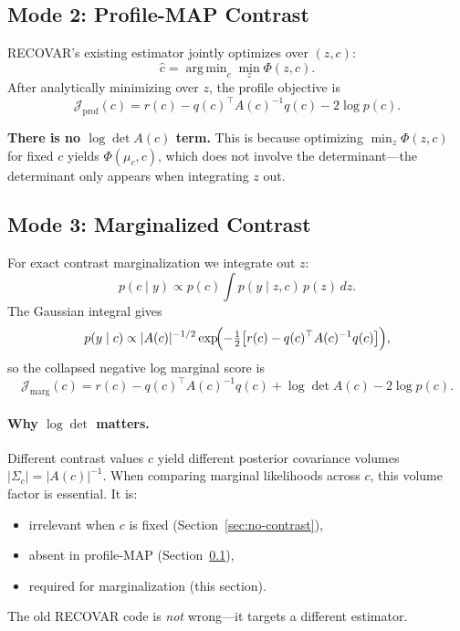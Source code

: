 \documentclass[11pt]{article}
\DeclareMathOperator*{\argmin}{arg\,min}
\begin{document}
\subsection{Mode 2: Profile-MAP Contrast}
\label{sec:profile}

RECOVAR's existing estimator jointly optimizes over $(z, c)$:
\begin{equation}
  \hat{c} = \argmin_c \min_z \Phi(z, c).
\end{equation}
After analytically minimizing over $z$, the profile objective is
\begin{equation}
  \label{eq:profile}
  \mathcal{J}_{\text{prof}}(c)
  = r(c) - q(c)^\top A(c)^{-1} q(c) - 2\log p(c).
\end{equation}

\textbf{There is no $\log\det A(c)$ term.}  This is because optimizing
$\min_z \Phi(z, c)$ for fixed $c$ yields $\Phi(\mu_c, c)$, which does not
involve the determinant---the determinant only appears when integrating
$z$ out.

\subsection{Mode 3: Marginalized Contrast}
\label{sec:marginalize}

For exact contrast marginalization we integrate out $z$:
\begin{equation}
  p(c \mid y) \propto p(c) \int p(y \mid z, c)\, p(z)\, dz.
\end{equation}
The Gaussian integral gives
\begin{equation}
  p(y \mid c) \propto |A(c)|^{-1/2}
  \exp\!\Bigl(-\tfrac{1}{2}\bigl[r(c) - q(c)^\top A(c)^{-1} q(c)\bigr]\Bigr),
\end{equation}
so the collapsed negative log marginal score is
\begin{equation}
  \label{eq:marginal}
  \boxed{
    \mathcal{J}_{\text{marg}}(c)
    = r(c) - q(c)^\top A(c)^{-1} q(c) + \log\det A(c) - 2\log p(c).
  }
\end{equation}

\paragraph{Why $\log\det$ matters.}
Different contrast values $c$ yield different posterior covariance volumes
$|\Sigma_c| = |A(c)|^{-1}$.  When comparing marginal likelihoods across
$c$, this volume factor is essential.  It is:
\begin{itemize}
  \item irrelevant when $c$ is fixed (Section~\ref{sec:no-contrast}),
  \item absent in profile-MAP (Section~\ref{sec:profile}),
  \item required for marginalization (this section).
\end{itemize}
The old RECOVAR code is \emph{not} wrong---it targets a different
estimator.
\end{document}
